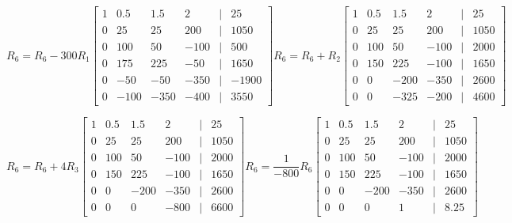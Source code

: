 \documentclass[11pt]{article}
\begin{document}
\begin{enumerate}
\begin{enumerate}
\[
    R_6 = R_6 - 300R_1
    \begin{bmatrix}
        1 & 0.5 & 1.5 & 2 &|& 25 \\
        0 & 25 & 25 & 200 &|& 1050 \\
        0 & 100 & 50 & -100 &|& 500 \\
        0 & 175 & 225 & -50 &|& 1650 \\
        0 & -50 & -50 & -350 &|& -1900 \\
        0 & -100 & -350 & -400 &|& 3550
    \end{bmatrix}
    R_6 = R_6 + R_2
    \begin{bmatrix}
        1 & 0.5 & 1.5 & 2 &|& 25 \\
        0 & 25 & 25 & 200 &|& 1050 \\
        0 & 100 & 50 & -100 &|& 2000 \\
        0 & 150 & 225 & -100 &|& 1650 \\
        0 & 0 & -200 & -350 &|& 2600 \\
        0 & 0 & -325 & -200 &|& 4600
    \end{bmatrix}
\]

\[
    R_6 = R_6 + 4R_3
    \begin{bmatrix}
        1 & 0.5 & 1.5 & 2 &|& 25 \\
        0 & 25 & 25 & 200 &|& 1050 \\
        0 & 100 & 50 & -100 &|& 2000 \\
        0 & 150 & 225 & -100 &|& 1650 \\
        0 & 0 & -200 & -350 &|& 2600 \\
        0 & 0 & 0 & -800 &|& 6600
    \end{bmatrix}
    R_6 = \frac{1}{-800}R_6
    \begin{bmatrix}
        1 & 0.5 & 1.5 & 2 &|& 25 \\
        0 & 25 & 25 & 200 &|& 1050 \\
        0 & 100 & 50 & -100 &|& 2000 \\
        0 & 150 & 225 & -100 &|& 1650 \\
        0 & 0 & -200 & -350 &|& 2600 \\
        0 & 0 & 0 & 1 &|& 8.25
    \end{bmatrix}
\]


\end{enumerate}
\end{enumerate}
\end{document}
